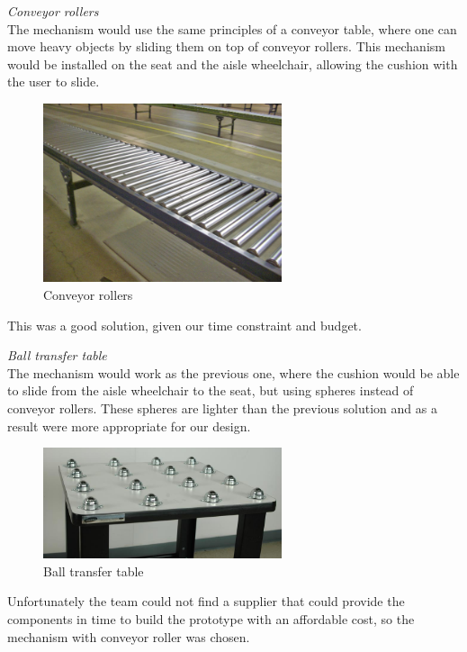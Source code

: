 \noindent\emph{Conveyor rollers}\\
The mechanism would use the same principles of a conveyor table, where one can move heavy objects by sliding them on top of conveyor rollers. This mechanism would be installed on the seat and the aisle wheelchair, allowing the cushion with the user to slide.

\begin{figure}[h]
\centering
\includegraphics[width=7cm]{brazil_images/image036.jpg}
\caption{Conveyor rollers} %
\label{fig:conveyor_rollers}
\end{figure}

 
This was a good solution, given our time constraint and budget.

\noindent\emph{Ball transfer table}\\
The mechanism would work as the previous one, where the cushion would be able to slide from the aisle wheelchair to the seat, but using spheres instead of conveyor rollers. These spheres are lighter than the previous solution and as a result were more appropriate for our design.

\begin{figure}[h]
\centering
\includegraphics[width=7cm]{brazil_images/image037.jpg}
\caption{Ball transfer table}%
\label{fig:ball_transfer}
\end{figure}

Unfortunately the team could not find a supplier that could provide the components in time to build the prototype with an affordable cost, so the mechanism with conveyor roller was chosen.

